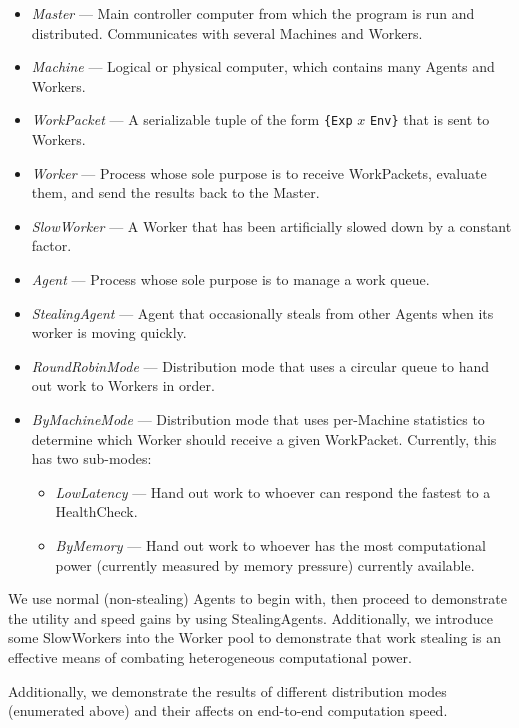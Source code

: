 \documentclass[letterpaper,twocolumn,10pt]{article}
\begin{document}
\begin{itemize}
    \item \textit{Master} --- Main controller computer from which the program
        is run and distributed. Communicates with several Machines and Workers.
    \item \textit{Machine} --- Logical or physical computer, which contains
        many Agents and Workers.
    \item \textit{WorkPacket} --- A serializable tuple of the form \verb|{Exp|
        $x$ \verb|Env}| that is sent to Workers.
    \item \textit{Worker} --- Process whose sole purpose is to receive
        WorkPackets, evaluate them, and send the results back to the Master.
    \item \textit{SlowWorker} --- A Worker that has been artificially slowed
        down by a constant factor.
    \item \textit{Agent} --- Process whose sole purpose is to manage a work
        queue.
    \item \textit{StealingAgent} --- Agent that occasionally steals from other
        Agents when its worker is moving quickly.
    \item \textit{RoundRobinMode} --- Distribution mode that uses a circular
        queue to hand out work to Workers in order.
    \item \textit{ByMachineMode} --- Distribution mode that uses per-Machine
        statistics to determine which Worker should receive a given WorkPacket.
        Currently, this has two sub-modes:
        \begin{itemize}
            \item \textit{LowLatency} --- Hand out work to whoever can respond
                the fastest to a HealthCheck.
            \item \textit{ByMemory} --- Hand out work to whoever has the most
                computational power (currently measured by memory pressure)
                currently available.
        \end{itemize}
\end{itemize}

We use normal (non-stealing) Agents to begin with, then proceed to demonstrate
the utility and speed gains by using StealingAgents. Additionally, we introduce
some SlowWorkers into the Worker pool to demonstrate that work stealing is an
effective means of combating heterogeneous computational power.

Additionally, we demonstrate the results of different distribution modes
(enumerated above) and their affects on end-to-end computation speed.
\end{document}
